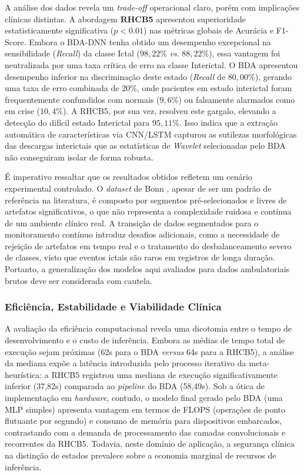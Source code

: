\documentclass[alpha-refs,brazilian]{CC-EC_TF-TC}
\begin{document}
A análise dos dados revela um \textit{trade-off} operacional claro, porém com implicações clínicas distintas. A abordagem \textbf{RHCB5} apresentou superioridade estatisticamente significativa ($p < 0.01$) nas métricas globais de Acurácia e F1-Score. Embora o BDA-DNN tenha obtido um desempenho excepcional na sensibilidade (\textit{Recall}) da classe Ictal ($98,22\%$ \textit{vs}. $88,22\%$), essa vantagem foi neutralizada por uma taxa crítica de erro na classe Interictal. O BDA apresentou desempenho inferior na discriminação deste estado (\textit{Recall} de $80,00\%$), gerando uma taxa de erro combinada de 20\%, onde pacientes em estado interictal foram frequentemente confundidos com normais ($9,6\%$) ou falsamente alarmados como em crise ($10,4\%$). A RHCB5, por sua vez, resolveu este gargalo, elevando a detecção do difícil estado Interictal para $95,11\%$. Isso indica que a extração automática de características via CNN/LSTM capturou as sutilezas morfológicas das descargas interictais que as estatísticas de \textit{Wavelet} selecionadas pelo BDA não conseguiram isolar de forma robusta.

É imperativo ressaltar que os resultados obtidos refletem um cenário experimental controlado. O \textit{dataset} de Bonn \citep{UKB_EEGDataDownload}, apesar de ser um padrão de referência na literatura, é composto por segmentos pré-selecionados e livres de artefatos significativos, o que não representa a complexidade ruidosa e contínua de um ambiente clínico real. A transição de dados segmentados para o monitoramento contínuo introduz desafios adicionais, como a necessidade de rejeição de artefatos em tempo real e o tratamento do desbalanceamento severo de classes, visto que eventos ictais são raros em registros de longa duração. Portanto, a generalização dos modelos aqui avaliados para dados ambulatoriais brutos deve ser considerada com cautela.

\subsubsection{Eficiência, Estabilidade e Viabilidade Clínica}

A avaliação da eficiência computacional revela uma dicotomia entre o tempo de desenvolvimento e o custo de inferência. Embora as médias de tempo total de execução sejam próximas (62s para o BDA \textit{versus} 64s para a RHCB5), a análise da mediana expõe a latência introduzida pelo processo iterativo da meta-heurística: a RHCB5 registrou uma mediana de execução significativamente inferior (37,82s) comparada ao \textit{pipeline} do BDA (58,49s). Sob a ótica de implementação em \textit{hardware}, contudo, o modelo final gerado pelo BDA (uma MLP simples) apresenta vantagem em termos de FLOPS (operações de ponto flutuante por segundo) e consumo de memória para dispositivos embarcados, contrastando com a demanda de processamento das camadas convolucionais e recorrentes da RHCB5. Todavia, neste domínio de aplicação, a segurança clínica na distinção de estados prevalece sobre a economia marginal de recursos de inferência.
\end{document}
